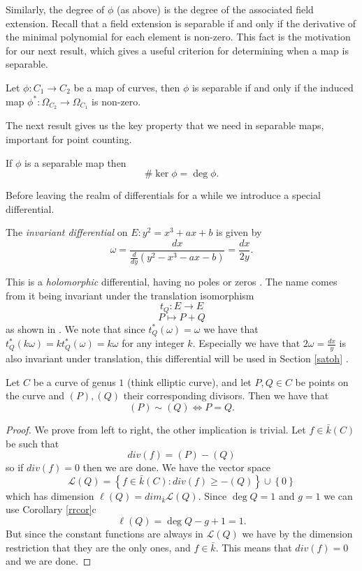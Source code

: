 Similarly, the degree of $\phi$ (as above) is the degree of the associated field extension.
Recall that a field extension is separable if and only if the derivative of the minimal
polynomial for each element is non-zero. This fact is the motivation for our next result,
which gives a useful criterion for determining when a map is separable.

\begin{prop} \label{diffsep}
 Let $\phi: C_1 \rightarrow C_2$ be a map of curves, then $\phi$ is separable if and only if
the induced map $\phi^*: \Omega_{C_2} \rightarrow \Omega_{C_1} $ is non-zero.
\end{prop}

The next result gives us the key property that we need in separable maps, important for
point counting.
\begin{thm} \label{kerdeg}
 If $\phi$ is a separable map then
$$\#\ker \phi = \deg \phi.$$
\end{thm}

Before leaving the realm of differentials for a while we introduce a special differential.
\begin{mydef}
The \emph{invariant differential} on $E: y^2 = x^3 + ax + b$ is given by
$$\omega = \frac{dx}{\frac{d}{dy}\left(y^2 - x^3  - ax - b\right)} = \frac{dx}{2y}.$$
\end{mydef}
This is a \emph{holomorphic} differential, having no poles or zeros \cite{AEC}. The name comes from it
being invariant under the translation isomorphism
$$ t_Q: E \rightarrow E$$
$$ P \mapsto P + Q$$
as shown in \cite{AEC}. We note that since $t_Q^*(\omega) = \omega$ we have that
$t_Q^*(k\omega) = k t_Q^*(\omega) = k\omega$ for any integer $k$. Especially we have that
$2\omega = \frac{dx}{y}$ is also invariant under translation, this differential will be used
in Section \ref{satoh} \label{invariant}.

\begin{prop} \label{3.3}
 Let $C$ be a curve of genus $1$ (think elliptic curve), and let $P,Q\in C$ be points on the curve and
$(P), (Q)$ their corresponding divisors. Then we have that
$$ (P) \sim (Q) \iff P = Q.$$
\end{prop}
\begin{proof}
 We prove from left to right, the other implication is trivial. Let $f\in \bar{k}(C)$ be such that
$$ div(f) = (P)-(Q) $$
so if $div(f) = 0$ then we are done. We have the vector space
$$ \mathscr{L}(Q) = \left\{ f\in \bar{k}(C) : div(f) \geq -(Q) \right\} \cup \left\{ 0 \right\} $$
which has dimension $\ell(Q) = dim_{\bar{k}} \mathscr{L}(Q)$. Since $\deg Q = 1$ and $g = 1$
we can use Corollary \ref{rrcor}c 
$$\ell(Q) = \deg Q - g + 1 = 1.$$
But since the constant functions are always in $\mathscr{L}(Q)$ we have by the dimension restriction that
they are the only ones, and $f \in \bar{k}$. This means that $div(f) = 0$ and we are done.
\end{proof}

